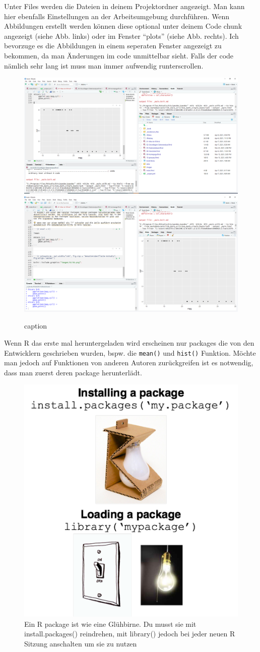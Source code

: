 \documentclass[
]{article}
\begin{document}
Unter Files werden die Dateien in deinem Projektordner angezeigt. Man kann hier ebenfalls Einstellungen an der Arbeitsumgebung durchführen. Wenn Abbildungen erstellt werden können diese optional unter deinem Code chunk angezeigt (siehe Abb. links) oder im Fenster ``plots'' (siehe Abb. rechts). Ich bevorzuge es die Abbildungen in einem seperaten Fenster angezeigt zu bekommen, da man Änderungen im code unmittelbar sieht. Falls der code nämlich sehr lang ist muss man immer aufwendig runterscrollen.

\begin{figure}

{\centering \includegraphics[width=0.49\linewidth,height=0.2\textheight]{images/009} \includegraphics[width=0.49\linewidth,height=0.2\textheight]{images/010} 

}

\caption{caption}\label{fig:unnamed-chunk-15}
\end{figure}

Wenn R das erste mal heruntergeladen wird erscheinen nur packages die von den Entwicklern geschrieben wurden, bspw. die \texttt{mean()} und \texttt{hist()} Funktion. Möchte man jedoch auf Funktionen von anderen Autoren zurückgreifen ist es notwendig, dass man zuerst deren package herunterlädt.

\begin{figure}

{\centering \includegraphics[width=0.5\linewidth]{images/011} 

}

\caption{Ein R package ist wie eine Glühbirne. Du musst sie mit install.packages() reindrehen, mit library() jedoch bei jeder neuen R Sitzung anschalten um sie zu nutzen}\label{fig:unnamed-chunk-16}
\end{figure}
\end{document}
